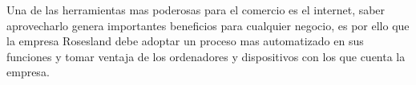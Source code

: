 Una de las herramientas mas poderosas para el comercio es el internet, 
saber aprovecharlo genera importantes beneficios para cualquier negocio, 
es por ello que la empresa Rosesland debe adoptar un proceso mas automatizado
en sus funciones y tomar ventaja de los ordenadores y dispositivos con los que cuenta la empresa.